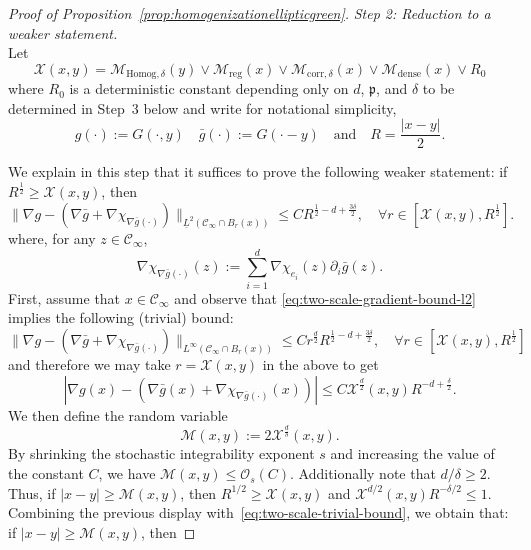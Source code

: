 \documentclass[12pt]{amsart}
\numberwithin{equation}{section}
\begin{document}
\begin{proof}[Proof of Proposition~\ref{prop:homogenizationellipticgreen}]
		
		
		\medskip
		{\it Step 2: Reduction to a weaker statement.} \\
		Let 
		\begin{equation} \label{eq:choice-of-minimal-scale}
			\mathcal{X}(x,y) = \mathcal{M}_{\mathrm{Homog}, \delta}(y) \vee \mathcal{M}_{\mathrm{reg}}(x) \vee \mathcal{M}_{\mathrm{corr}, \delta}(x) \vee \mathcal{M}_{\mathrm{dense}}(x) \vee R_0
		\end{equation}
		where $R_0$ is a deterministic constant depending only on $d$, $\mathfrak{p}$, and $\delta$ to be determined in Step~3 below
		and write for notational simplicity, 
		\[
		g(\cdot) := G(\cdot, y) \quad \bar{g}(\cdot) := G(\cdot-y) \quad \mbox{and} \quad R = \frac{|x-y|}{2}. 
		\]
		
		We explain in this step that it suffices to prove the following weaker statement:  if $R^{\frac{1}{2}} \geq \mathcal{X}(x,y)$, then
		\begin{equation} \label{eq:two-scale-gradient-bound-l2}
			\| \nabla g - (\nabla \bar{g} + \nabla \chi_{\nabla \bar{g}(\cdot) }) \|_{\underline{L}^2(\mathscr{C}_{\infty} \cap B_r(x))}
			\leq C R^{ \frac{1}{2}- d + \frac{3\delta}{2}}, \quad \forall r \in [\mathcal{X}(x,y), R^{\frac{1}{2}}].
		\end{equation}
		where, for any $z \in \mathscr{C}_\infty$,
		\[
		\nabla \chi_{\nabla \bar{g}(\cdot) }(z) :=  \sum_{i = 1}^d \nabla \chi_{e_i}(z) \partial_i \bar g(z) .
		\]
		First, assume that $x \in \mathscr{C}_\infty$ and observe that \eqref{eq:two-scale-gradient-bound-l2} implies the following (trivial) bound: 
		\[
		\| \nabla g - (\nabla \bar{g} + \nabla \chi_{\nabla \bar{g}(\cdot) }) \|_{{L}^\infty(\mathscr{C}_{\infty} \cap B_r(x))}\leq C r^{\frac{d}{2}} R^{ \frac{1}{2}- d + \frac{3\delta}{2}}, \quad \forall r \in [\mathcal{X}(x,y), R^{\frac{1}{2}}]
		\]
		and therefore we may take $r = \mathcal{X}(x,y)$ in the above to get
		\begin{equation} \label{eq:two-scale-trivial-bound}
			| \nabla g(x) - (\nabla \bar{g}(x) + \nabla \chi_{\nabla \bar{g}(\cdot) }(x))| \leq C \mathcal{X}^{\frac{d}{2}}(x,y) R^{- d + \frac{\delta}{2}}.
		\end{equation}
		We then define the random variable
		\begin{equation*}
			\mathcal{M}(x , y) := 2 \mathcal{X}^{\frac{d}{\delta}}(x , y).
		\end{equation*}
		By shrinking the stochastic integrability exponent $s$ and increasing the value of the constant $C$, we have $\mathcal{M}(x , y) \leq \mathcal{O}_s(C)$. Additionally note that $d/\delta \geq 2$. Thus, if $|x - y| \geq \mathcal{M}(x , y)$, then $R^{1/2}\geq \mathcal{X}(x , y)$ and $\mathcal{X}^{d/2}(x , y) R^{-\delta/2} \leq 1.$ Combining the previous display with~\eqref{eq:two-scale-trivial-bound}, we obtain that: if $|x - y| \geq \mathcal{M}(x , y)$, then

\end{proof}
\end{document}
